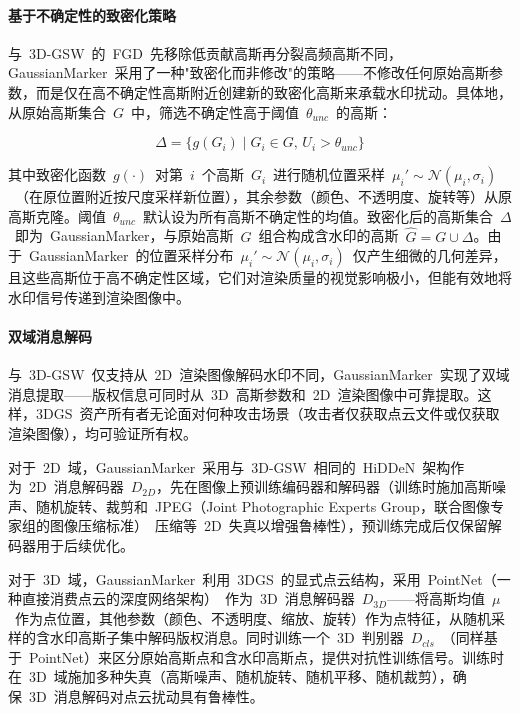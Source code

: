 \paragraph{基于不确定性的致密化策略}
与~3D-GSW~的~FGD~先移除低贡献高斯再分裂高频高斯不同，GaussianMarker~采用了一种"致密化而非修改"的策略——不修改任何原始高斯参数，而是仅在高不确定性高斯附近创建新的致密化高斯来承载水印扰动。具体地，从原始高斯集合~$G$~中，筛选不确定性高于阈值~$\theta_{unc}$~的高斯：

\begin{equation}
  \Delta = \{g(G_i) \mid G_i \in G, \, U_i > \theta_{unc}\}
\end{equation}

其中致密化函数~$g(\cdot)$~对第~$i$~个高斯~$G_i$~进行随机位置采样~$\mu_i' \sim \mathcal{N}(\mu_i, \sigma_i)$~（在原位置附近按尺度采样新位置），其余参数（颜色、不透明度、旋转等）从原高斯克隆。阈值~$\theta_{unc}$~默认设为所有高斯不确定性的均值。致密化后的高斯集合~$\Delta$~即为~GaussianMarker，与原始高斯~$G$~组合构成含水印的高斯~$\hat{G} = G \cup \Delta$。由于~GaussianMarker~的位置采样分布~$\mu_i' \sim \mathcal{N}(\mu_i, \sigma_i)$~仅产生细微的几何差异，且这些高斯位于高不确定性区域，它们对渲染质量的视觉影响极小，但能有效地将水印信号传递到渲染图像中。

\paragraph{双域消息解码}
与~3D-GSW~仅支持从~2D~渲染图像解码水印不同，GaussianMarker~实现了双域消息提取——版权信息可同时从~3D~高斯参数和~2D~渲染图像中可靠提取。这样，3DGS~资产所有者无论面对何种攻击场景（攻击者仅获取点云文件或仅获取渲染图像），均可验证所有权。

对于~2D~域，GaussianMarker~采用与~3D-GSW~相同的~HiDDeN~架构作为~2D~消息解码器~$D_{2D}$，先在图像上预训练编码器和解码器（训练时施加高斯噪声、随机旋转、裁剪和~JPEG（Joint Photographic Experts Group，联合图像专家组的图像压缩标准）~压缩等~2D~失真以增强鲁棒性），预训练完成后仅保留解码器用于后续优化。

对于~3D~域，GaussianMarker~利用~3DGS~的显式点云结构，采用~PointNet（一种直接消费点云的深度网络架构）~作为~3D~消息解码器~$D_{3D}$——将高斯均值~$\mu$~作为点位置，其他参数（颜色、不透明度、缩放、旋转）作为点特征，从随机采样的含水印高斯子集中解码版权消息。同时训练一个~3D~判别器~$D_{cls}$~（同样基于~PointNet）来区分原始高斯点和含水印高斯点，提供对抗性训练信号。训练时在~3D~域施加多种失真（高斯噪声、随机旋转、随机平移、随机裁剪），确保~3D~消息解码对点云扰动具有鲁棒性。

